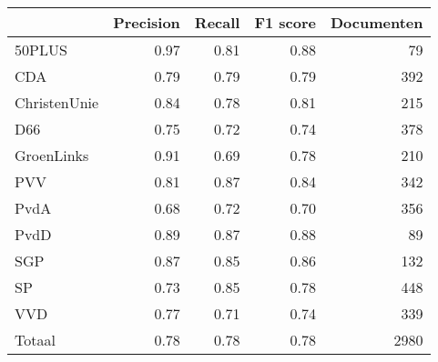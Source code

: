 \begin{tabular}{lrrrr}
\toprule
{} &  Precision &  Recall &  F1 score &  Documenten \\
\midrule
50PLUS       &       0.97 &    0.81 &      0.88 &          79 \\
CDA          &       0.79 &    0.79 &      0.79 &         392 \\
ChristenUnie &       0.84 &    0.78 &      0.81 &         215 \\
D66          &       0.75 &    0.72 &      0.74 &         378 \\
GroenLinks   &       0.91 &    0.69 &      0.78 &         210 \\
PVV          &       0.81 &    0.87 &      0.84 &         342 \\
PvdA         &       0.68 &    0.72 &      0.70 &         356 \\
PvdD         &       0.89 &    0.87 &      0.88 &          89 \\
SGP          &       0.87 &    0.85 &      0.86 &         132 \\
SP           &       0.73 &    0.85 &      0.78 &         448 \\
VVD          &       0.77 &    0.71 &      0.74 &         339 \\
Totaal       &       0.78 &    0.78 &      0.78 &        2980 \\
\bottomrule
\end{tabular}

